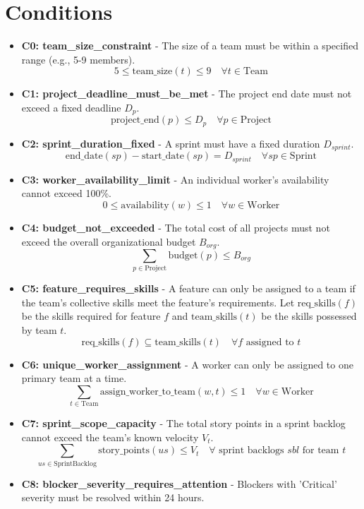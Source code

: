 \documentclass[11pt]{article}
\begin{document}
\section{Conditions}
\begin{itemize}
    \item \textbf{C0: team\_size\_constraint} - The size of a team must be within a specified range (e.g., 5-9 members).
        \[ 5 \leq \text{team\_size}(t) \leq 9 \quad \forall t \in \text{Team} \]
    \item \textbf{C1: project\_deadline\_must\_be\_met} - The project end date must not exceed a fixed deadline $D_p$.
        \[ \text{project\_end}(p) \leq D_p \quad \forall p \in \text{Project} \]
    \item \textbf{C2: sprint\_duration\_fixed} - A sprint must have a fixed duration $D_{sprint}$.
        \[ \text{end\_date}(sp) - \text{start\_date}(sp) = D_{sprint} \quad \forall sp \in \text{Sprint} \]
    \item \textbf{C3: worker\_availability\_limit} - An individual worker's availability cannot exceed 100\%.
        \[ 0 \leq \text{availability}(w) \leq 1 \quad \forall w \in \text{Worker} \]
    \item \textbf{C4: budget\_not\_exceeded} - The total cost of all projects must not exceed the overall organizational budget $B_{org}$.
        \[ \sum_{p \in \text{Project}} \text{budget}(p) \leq B_{org} \]
    \item \textbf{C5: feature\_requires\_skills} - A feature can only be assigned to a team if the team's collective skills meet the feature's requirements. Let $\text{req\_skills}(f)$ be the skills required for feature $f$ and $\text{team\_skills}(t)$ be the skills possessed by team $t$.
        \[ \text{req\_skills}(f) \subseteq \text{team\_skills}(t) \quad \forall f \text{ assigned to } t \]
    \item \textbf{C6: unique\_worker\_assignment} - A worker can only be assigned to one primary team at a time.
        \[ \sum_{t \in \text{Team}} \text{assign\_worker\_to\_team}(w, t) \leq 1 \quad \forall w \in \text{Worker} \]
    \item \textbf{C7: sprint\_scope\_capacity} - The total story points in a sprint backlog cannot exceed the team's known velocity $V_t$.
        \[ \sum_{us \in \text{SprintBacklog}} \text{story\_points}(us) \leq V_t \quad \forall \text{ sprint backlogs } sbl \text{ for team } t \]
    \item \textbf{C8: blocker\_severity\_requires\_attention} - Blockers with 'Critical' severity must be resolved within 24 hours.

\end{itemize}
\end{document}
